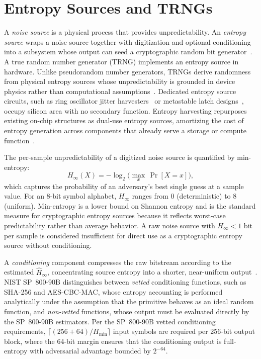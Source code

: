 \section{Entropy Sources and TRNGs}
\label{sec:bg-entropy}

A \emph{noise source} is a physical process that provides
unpredictability. An \emph{entropy source} wraps a noise source together
with digitization and optional conditioning into a subsystem whose
output can seed a cryptographic random bit
generator~\cite{sonmez2016recommendation}. A true random number
generator (TRNG) implements an entropy source in hardware. Unlike
pseudorandom number generators, TRNGs derive randomness from physical
entropy sources whose unpredictability is grounded in device physics
rather than computational assumptions~\cite{sunar2007provably}.
Dedicated entropy source circuits, such as ring oscillator jitter
harvesters~\cite{sunar2007provably} or metastable latch
designs~\cite{tokunaga2008true}, occupy silicon area with no secondary
function. Entropy harvesting repurposes existing on-chip structures as
dual-use entropy sources, amortizing the cost of entropy generation
across components that already serve a storage or compute
function~\cite{holcomb2009power, wang2012flash, kim2019d}.

The per-sample unpredictability of a digitized noise source is
quantified by min-entropy:
\begin{equation}
	\label{eq:hmin}
	H_\infty(X) = -\log_2\!\bigl(\max_{x}\,\Pr[X = x]\bigr),
\end{equation}
which captures the probability of an adversary's best single guess at a
sample value. For an 8-bit symbol alphabet, $H_\infty$ ranges from 0 (deterministic) to 8 (uniform).
Min-entropy is a lower bound on Shannon entropy and is the standard
measure for cryptographic entropy sources because it reflects worst-case
predictability rather than average behavior. A raw noise source with
$H_\infty < 1$ bit per sample is considered insufficient for direct use
as a cryptographic entropy source without conditioning.

A \emph{conditioning} component compresses the raw bitstream according
to the estimated $\hat{H}_\infty$, concentrating source entropy into a
shorter, near-uniform output~\cite{sonmez2016recommendation}. NIST
SP~800-90B distinguishes between \emph{vetted} conditioning functions,
such as SHA-256 and AES-CBC-MAC, whose entropy accounting is performed
analytically under the assumption that the primitive behaves as an ideal
random function, and \emph{non-vetted} functions, whose output must be
evaluated directly by the SP~800-90B estimators. Per the SP~800-90B
vetted conditioning requirements, $\lceil(256 + 64) /
	H_\text{min}\rceil$ input symbols are required per 256-bit output block,
where the 64-bit margin ensures that the conditioning output is
full-entropy with adversarial advantage bounded by $2^{-64}$.

